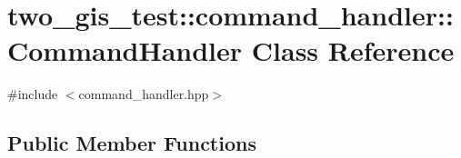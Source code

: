 \hypertarget{classtwo__gis__test_1_1command__handler_1_1_command_handler}{}\section{two\+\_\+gis\+\_\+test\+:\+:command\+\_\+handler\+:\+:Command\+Handler Class Reference}
\label{classtwo__gis__test_1_1command__handler_1_1_command_handler}


{\ttfamily \#include $<$command\+\_\+handler.\+hpp$>$}

\subsection*{Public Member Functions}
